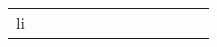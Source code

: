 \documentclass[runningheads]{llncs}
\begin{document}
\begin{table}[!ht]
\begin{tabular}{|p{7em}|p{2.5em}|p{2.5em}|p{3em}|p{2.5em}|p{3em}|p{2.5em}|p{3em}|p{2.5em}|p{3em}|p{2.5em}|p{3em}|}
li
\end{tabular}
\end{table}
\end{document}
